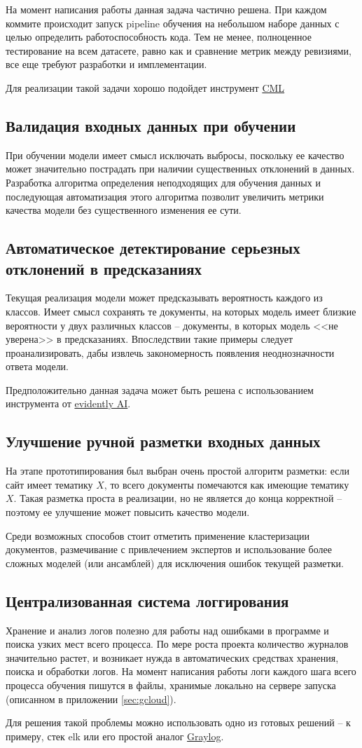     На момент написания работы данная задача частично решена.
    При каждом коммите происходит запуск \gls{pipeline} обучения на небольшом наборе данных с целью определить работоспособность кода.
    Тем не менее, полноценное тестирование на всем датасете, равно как и сравнение метрик между ревизиями, все еще требуют разработки и имплементации.

    Для реализации такой задачи хорошо подойдет инструмент \href{https://cml.dev/}{CML}
    \subsection{Валидация входных данных при обучении}
    При обучении модели имеет смысл исключать выбросы, поскольку ее качество может значительно пострадать при наличии существенных отклонений в данных.
    Разработка алгоритма определения неподходящих для обучения данных и последующая автоматизация этого алгоритма позволит увеличить метрики качества модели без существенного изменения ее сути.
    \subsection{Автоматическое детектирование серьезных отклонений в предсказаниях}
    Текущая реализация модели может предсказывать вероятность каждого из классов.
    Имеет смысл сохранять те документы, на которых модель имеет близкие вероятности у двух различных классов -- документы, в которых модель <<не уверена>> в предсказаниях.
    Впоследствии такие примеры следует проанализировать, дабы извлечь закономерность появления неоднозначности ответа модели.

    Предположительно данная задача может быть решена с использованием инструмента от \href{https://evidentlyai.com/}{evidently AI}.
    \subsection{Улучшение ручной разметки входных данных}
    На этапе прототипирования был выбран очень простой алгоритм разметки: если сайт имеет тематику $X$, то всего документы помечаются как имеющие тематику $X$.
    Такая разметка проста в реализации, но не является до конца корректной -- поэтому ее улучшение может повысить качество модели.

    Среди возможных способов стоит отметить применение кластеризации документов, размечивание с привлечением экспертов и использование более сложных моделей (или ансамблей) для исключения ошибок текущей разметки.
    \subsection{Централизованная система логгирования}
    Хранение и анализ логов полезно для работы над ошибками в программе и поиска узких мест всего процесса.
    По мере роста проекта количество журналов значительно растет, и возникает нужда в автоматических средствах хранения, поиска и обработки логов.
    На момент написания работы логи каждого шага всего процесса обучения пишутся в файлы, хранимые локально на сервере запуска (описанном в приложении \ref{sec:gcloud}).

    Для решения такой проблемы можно использовать одно из готовых решений -- к примеру, стек \gls{elk} или его простой аналог \href{https://www.graylog.org/}{Graylog}.
